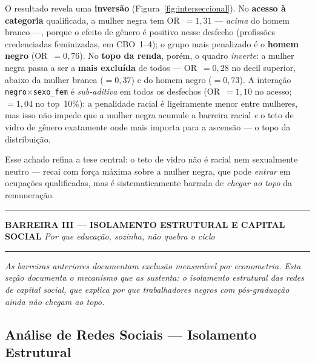 \documentclass[12pt, a4paper, oneside]{article}
\begin{document}
O resultado revela uma \textbf{inversão} (Figura~\ref{fig:interseccional}). No
\textbf{acesso à categoria} qualificada, a mulher negra tem OR~$=1,31$
--- \emph{acima} do homem branco ---, porque o efeito de gênero é positivo nesse
desfecho (profissões credenciadas feminizadas, em CBO~1--4); o grupo mais penalizado
é o \textbf{homem negro} (OR~$=0,76$). No \textbf{topo da renda},
porém, o quadro \emph{inverte}: a mulher negra passa a ser a \textbf{mais excluída}
de todos --- OR~$=0,28$ no decil superior, abaixo da mulher branca
($=0,37$) e do homem negro ($=0,73$). A
interação \texttt{negro$\times$sexo\_fem} é \textit{sub-aditiva} em todos os desfechos
(OR~$=1,10$ no acesso; $=1,04$ no top~10\%):
a penalidade racial é ligeiramente menor entre mulheres, mas isso não impede que a
mulher negra acumule a barreira racial \emph{e} o teto de vidro de gênero exatamente
onde mais importa para a ascensão --- o topo da distribuição.

Esse achado refina a tese central: o teto de vidro não é racial nem sexualmente neutro
--- recai com força máxima sobre a mulher negra, que pode \emph{entrar} em ocupações
qualificadas, mas é sistematicamente barrada de \emph{chegar ao topo} da remuneração.

\noindent\rule{\textwidth}{1pt}
\textbf{\large BARREIRA III --- ISOLAMENTO ESTRUTURAL E CAPITAL SOCIAL}
\textit{Por que educação, sozinha, não quebra o ciclo}
\noindent\rule{\textwidth}{1pt}

\medskip

\textit{As barreiras anteriores documentam exclusão mensurável por econometria.
Esta seção documenta o mecanismo que as sustenta: o isolamento estrutural
das redes de capital social, que explica por que trabalhadores negros com
pós-graduação ainda não chegam ao topo.}

\subsection{Análise de Redes Sociais --- Isolamento Estrutural}
\label{subsec:sna}
\end{document}
